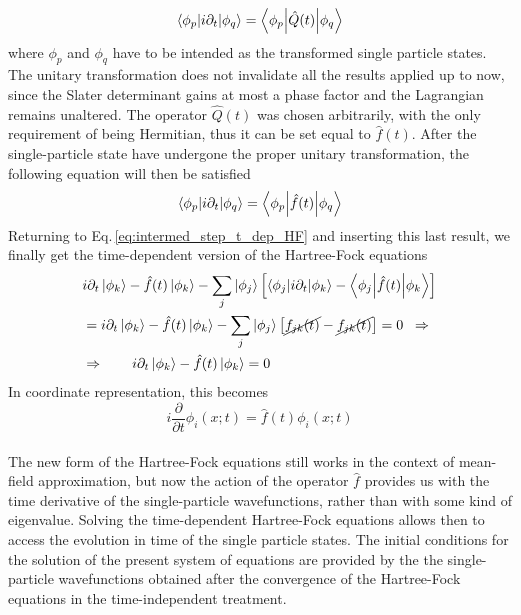 \begin{equation*}
    \bracketOP{\phi_p}{\phi_q}{i \partial_t} = \bracketOP{\phi_p}{\phi_q}{\hat{Q}(t)}
\end{equation*}
where $\phi_p$ and $\phi_q$ have to be intended as the transformed single particle states. The unitary transformation does not invalidate all the results applied up to now, since the Slater determinant gains at most a phase factor and the Lagrangian remains unaltered. The operator $\hat{Q}(t)$ was chosen arbitrarily, with the only requirement of being Hermitian, thus it can be set equal to $\hat{f}(t)$. After the single-particle state have undergone the proper unitary transformation, the following equation will then be satisfied
\begin{equation*}
    \bracketOP{\phi_p}{\phi_q}{i \partial_t} = \bracketOP{\phi_p}{\phi_q}{\hat{f}(t)}
\end{equation*}
Returning to Eq.\,\ref{eq:intermed_step_t_dep_HF} and inserting this last result, we finally get the time-dependent version of the Hartree-Fock equations
\begin{align*}
    &i\partial_t \ket{\phi_k} - \hat{f}(t) \ket{\phi_k} - \sum_j \ket{\phi_j} \left[ \bracketOP{\phi_j}{\phi_k}{i\partial_t} - \bracketOP{\phi_j}{\phi_k}{\hat{f}(t)} \right] \\
    &= i\partial_t \ket{\phi_k} - \hat{f}(t) \ket{\phi_k} - \sum_j \ket{\phi_j} \left[ \cancel{f_{jk}(t)} - \cancel{f_{jk}(t)} \right] = 0 \;\; \Rightarrow \\
    &\Rightarrow \qquad i\partial_t \ket{\phi_k} - \hat{f}(t) \ket{\phi_k} = 0
\end{align*}
In coordinate representation, this becomes
\begin{equation}
    i \frac{\partial }{\partial t} \phi_i(x;t) = \hat{f}(t) \phi_i(x;t)
    \label{eq:HF_eq_time_dep}
\end{equation}\\
The new form of the Hartree-Fock equations still works in the context of mean-field approximation, but now the action of the operator $\hat{f}$ provides us with the time derivative of the single-particle wavefunctions, rather than with some kind of eigenvalue. Solving the time-dependent Hartree-Fock equations allows then to access the evolution in time of the single particle states. The initial conditions for the solution of the present system of equations are provided by the the single-particle wavefunctions obtained after the convergence of the Hartree-Fock equations in the time-independent treatment. 

